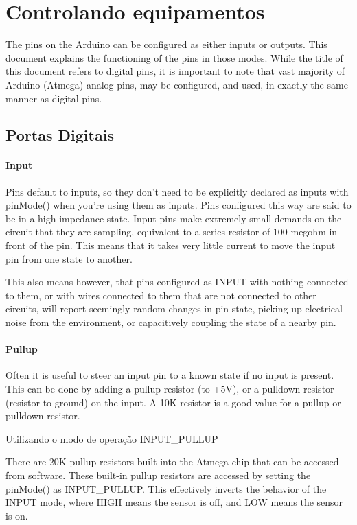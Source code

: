 \section{Controlando equipamentos}
The pins on the Arduino can be configured as either inputs or outputs. This document explains the functioning of the pins in those modes. While the title of this document refers to digital pins, it is important to note that vast majority of Arduino (Atmega) analog pins, may be configured, and used, in exactly the same manner as digital pins.

	
\subsection{Portas Digitais}

\paragraph{Input}
Pins default to inputs, so they don't need to be explicitly declared as inputs with pinMode() when you're using them as inputs. Pins configured this way are said to be in a high-impedance state. Input pins make extremely small demands on the circuit that they are sampling, equivalent to a series resistor of 100 megohm in front of the pin. This means that it takes very little current to move the input pin from one state to another.

This also means however, that pins configured as INPUT with nothing connected to them, or with wires connected to them that are not connected to other circuits, will report seemingly random changes in pin state, picking up electrical noise from the environment, or capacitively coupling the state of a nearby pin.

\paragraph{Pullup}
Often it is useful to steer an input pin to a known state if no input is present. This can be done by adding a pullup resistor (to +5V), or a pulldown resistor (resistor to ground) on the input. A 10K resistor is a good value for a pullup or pulldown resistor.

Utilizando o modo de operação INPUT_PULLUP 

There are 20K pullup resistors built into the Atmega chip that can be accessed from software. These built-in pullup resistors are accessed by setting the pinMode() as INPUT_PULLUP. This effectively inverts the behavior of the INPUT mode, where HIGH means the sensor is off, and LOW means the sensor is on.


